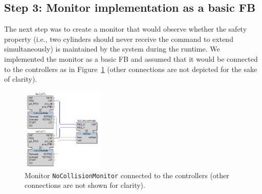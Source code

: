 \documentclass[conference]{IEEEtran}
\begin{document}



\subsection{Step 3: Monitor implementation as a basic FB}


The next step was to create a monitor that would observe whether the safety property (i.e., two cylinders should never receive the command to extend simultaneously) is maintained by the system during the runtime. We implemented the monitor as a basic FB and assumed that it would be connected to the controllers as in Figure~\ref{fig:monitorplacement} (other connections are not depicted for the sake of clarity).


\begin{figure}[h!]
    \centering
    \includegraphics[width=0.35\textwidth]{pic/monitorplacement.png}
    \caption{Monitor \texttt{NoCollisionMonitor} connected to the controllers (other connections are not shown for clarity).}
    \label{fig:monitorplacement}
\end{figure}
\end{document}
